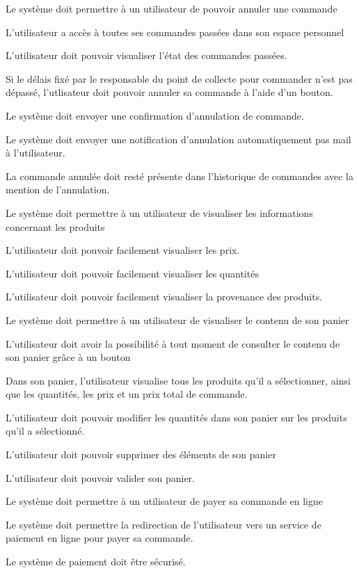 \begin{reqf}{Le système doit permettre à un utilisateur de pouvoir annuler une commande}
\item L'utilisateur a accès à toutes ses commandes passées dans son espace personnel
\item L'utilisateur doit pouvoir visualiser l'état des commandes passées.
\item Si le délais fixé par le responsable du point de collecte pour commander n'est pas dépassé, l'utlisateur doit pouvoir annuler sa commande à l'aide d'un bouton.
\item Le système doit envoyer une confirmation d'annulation de commande.
\item Le système doit envoyer une notification d'annulation automatiquement pas mail à l'utilisateur.
\item La commande annulée doit resté présente dans l'historique de commandes avec la mention de l'annulation.
\end{reqf}

\begin{reqf}{Le système doit permettre à un utilisateur de visualiser les informations concernant les produits}
\item L'utilisateur doit pouvoir facilement visualiser les prix.
\item L'utilisateur doit pouvoir facilement visualiser les quantités
\item L'utilisateur doit pouvoir facilement visualiser la provenance des produits.
\end{reqf}

\begin{reqf}{Le système doit permettre à un utilisateur de visualiser le contenu de son panier}
\item L'utilisateur doit avoir la possibilité à tout moment de consulter le contenu de son panier grâce à un bouton
\item Dans son panier, l'utilisateur visualise tous les produits qu'il a sélectionner, ainsi que les quantités, les prix et un prix total de commande.
\item L'utilisateur doit pouvoir modifier les quantités dans son panier sur les produits qu'il a sélectionné.
\item L'utilisateur doit pouvoir supprimer des éléments de son panier
\item L'utilisateur doit pouvoir valider son panier.
\end{reqf}

\begin{reqf}{Le système doit permettre à un utilisateur de payer sa commande en ligne}
\item Le système doit permettre la redirection de l'utilisateur vers un service de paiement en ligne pour payer sa commande.
\item Le système de paiement doit être sécurisé.
\end{reqf}

